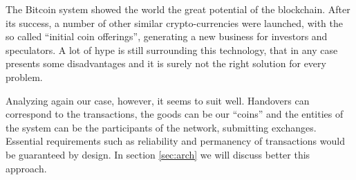 The Bitcoin system showed the world the great potential of the blockchain. After its success, a number of other similar crypto-currencies were launched, with the so called ``initial coin offerings'', generating a new business for investors and speculators. A lot of hype is still surrounding this technology, that in any case presents some disadvantages and it is surely not the right solution for every problem. 

Analyzing again our case, however, it seems to suit well. Handovers can correspond to the transactions, the goods can be our ``coins'' and the entities of the system can be the participants of the network, submitting exchanges. Essential requirements such as reliability and permanency of transactions would be guaranteed by design. In section \ref{sec:arch} we will discuss better this approach.

